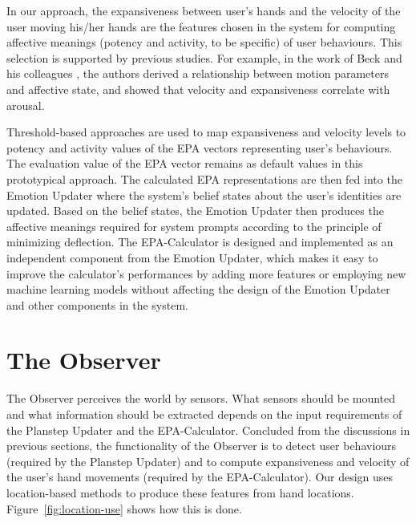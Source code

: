 In our approach, the expansiveness between user's hands and the velocity of the user moving his/her hands are the features chosen in the system for computing affective meanings (potency and activity, to be specific) of user behaviours. This selection is supported by previous studies. For example, in the work of Beck and his colleagues \cite{beck2010interpretation}, the authors derived a relationship between motion parameters and affective state, and showed that velocity and expansiveness correlate with arousal.

Threshold-based approaches are used to map expansiveness and velocity levels to potency and activity values of the EPA vectors representing user's behaviours. The evaluation value of the EPA vector remains as default values in this prototypical approach. The calculated EPA representations are then fed into the Emotion Updater where the system's belief states about the user's identities are updated. Based on the belief states, the Emotion Updater then produces the affective meanings required for system prompts according to the principle of minimizing deflection. The EPA-Calculator is designed and implemented as an independent component from the Emotion Updater, which makes it easy to improve the calculator's performances by adding more features or employing new machine learning models without affecting the design of the Emotion Updater and other components in the system.

\section{The Observer}
\label{sec:design-observer}

The Observer perceives the world by sensors. What sensors should be mounted and what information should be extracted depends on the input requirements of the Planstep Updater and the EPA-Calculator. Concluded from the discussions in previous sections, the functionality of the Observer is to detect user behaviours (required by the Planstep Updater) and to compute expansiveness and velocity of the user's hand movements (required by the EPA-Calculator). Our design uses location-based methods to produce these features from hand locations. Figure~\ref{fig:location-use} shows how this is done.


